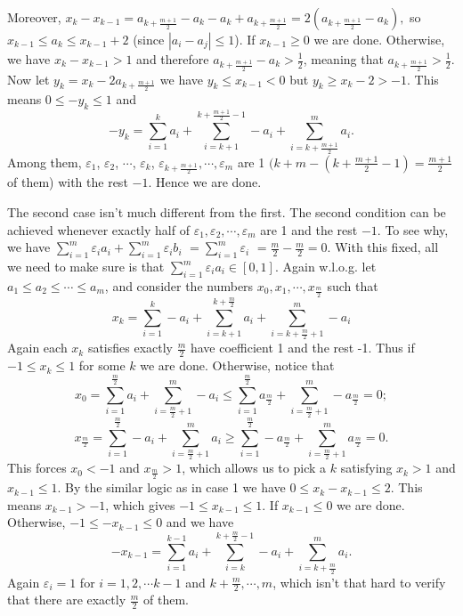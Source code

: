 \documentclass[11pt,a4paper]{article}
\begin{document}
\begin{itemize}
Moreover, $x_k-x_{k-1}=a_{k+\frac{m+1}{2}}-a_{k}-a_{k}+a_{k+\frac{m+1}{2}}=2(a_{k+\frac{m+1}{2}}-a_{k}), $
so $x_{k-1}\le a_k\le x_{k-1}+2$ (since $|a_i-a_j|\le 1$). 
If $x_{k-1}\ge 0$ we are done. 
Otherwise, we have $x_k-x_{k-1}>1$ and therefore $a_{k+\frac{m+1}{2}}-a_{k}>\frac 12$, 
meaning that $a_{k+\frac{m+1}{2}}>\frac 12$. 
Now let $y_k=x_k-2a_{k+\frac{m+1}{2}}$ we have $y_k\le x_{k-1}<0$ but $y_k\ge x_k-2>-1$. 
This means $0\le -y_k\le 1$ and 
\[-y_k=\sum_{i=1}^{k} a_i+\sum_{i=k+1}^{k+\frac{m+1}{2}-1} -a_i+\sum_{i=k+\frac{m+1}{2}}^{m} a_i.\] 
Among them, $\varepsilon_1$, $\varepsilon_2$, $\cdots$, $\varepsilon_k$, $\varepsilon_{k+\frac{m+1}2}, \cdots, \varepsilon_m$ are 1 $(k+m-(k+\frac{m+1}2-1)=\frac{m+1}2$ of them) with the rest $-1$. Hence we are done. 

The second case isn't much different from the first. 
The second condition can be achieved whenever exactly half of $\varepsilon_1, \varepsilon_2, \cdots , \varepsilon_m$ are 1 and the rest $-1$. 
To see why, we have 
$ \sum_{i=1}^m \varepsilon_i a_i  + \sum_{i=1}^m \varepsilon_i b_i $
$=\sum_{i=1}^m \varepsilon_i$
$=\frac m2-\frac m2=0$. 
With this fixed, all we need to make sure is that 
$ \sum_{i=1}^m \varepsilon_i a_i \in [0,1]$. 
Again w.l.o.g. let $a_1\le a_2\le\cdots \le a_m$, and consider the numbers 
$x_0, x_1, \cdots , x_{\frac{m}2}$ such that 
\[ x_k=\sum_{i=1}^{k} -a_i+\sum_{i=k+1}^{k+\frac{m}{2}} a_i+\sum_{i=k+\frac{m}{2}+1}^{m} -a_i\]
Again each $x_k$ satisfies exactly $\frac m2$ have coefficient 1 and the rest -1. 
Thus if $-1\le x_k\le 1$ for some $k$ we are done. 
Otherwise, notice that
\[x_0=\sum_{i=1}^{\frac{m}{2}} a_i+\sum_{i=\frac{m}{2}+1}^{m} -a_i
\le \sum_{i=1}^{\frac{m}{2}} a_{\frac{m}{2}} +\sum_{i=\frac{m}{2}+1}^{m} -a_{\frac{m}{2}}
=0;\]
\[x_{\frac{m}{2}}=\sum_{i=1}^{\frac{m}{2}} -a_i+\sum_{i=\frac{m}{2}+1}^{m} a_i
\ge \sum_{i=1}^{\frac{m}{2}} -a_{\frac{m}{2}} +\sum_{i=\frac{m}{2}+1}^{m} a_{\frac{m}{2}}
=0.\]
This forces $x_0<-1$ and $x_{\frac m2}>1$, 
which allows us to pick a $k$ satisfying $x_k>1$ and $x_{k-1}\le 1$. 
By the similar logic as in case 1 we have $0\le x_k-x_{k-1}\le 2$. 
This means $x_{k-1}>-1$, which gives $-1\le x_{k-1}\le 1$. 
If $x_{k-1}\le 0$ we are done. Otherwise, $-1\le -x_{k-1}\le 0$ and we have 
\[-x_{k-1}=\sum_{i=1}^{k-1} a_i+\sum_{i=k}^{k+\frac{m}{2}-1} -a_i+\sum_{i=k+\frac{m}{2}}^{m} a_i.\]
Again $\varepsilon_i=1$ for $i=1, 2, \cdots k-1$ and $k+\frac{m}{2}, \cdots, m$, which isn't that hard to verify that there are exactly $\frac m2$ of them. 


\end{itemize}
\end{document}
